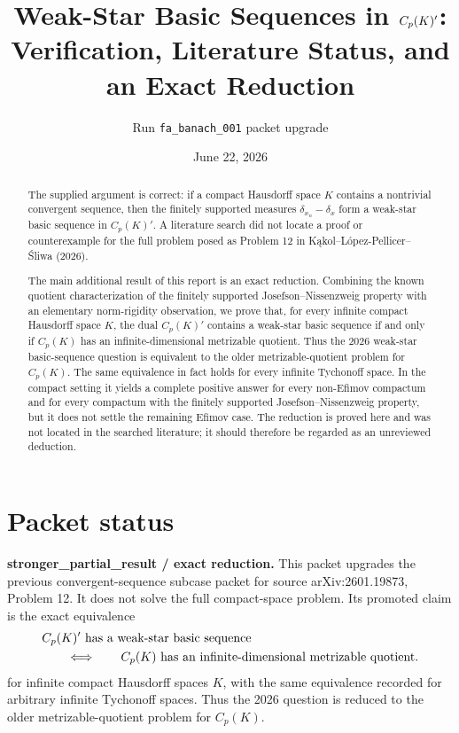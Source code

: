\documentclass[11pt]{article}
\title{Weak-Star Basic Sequences in $\Cp(K)'$: \\
Verification, Literature Status, and an Exact Reduction}
\author{Run \texttt{fa\_banach\_001} packet upgrade}
\date{June 22, 2026}
\newcommand{\Cp}{C_p}
\begin{document}
\maketitle

\begin{abstract}
The supplied argument is correct: if a compact Hausdorff space $K$ contains a
nontrivial convergent sequence, then the finitely supported measures
$\delta_{x_n}-\delta_x$ form a weak-star basic sequence in $\Cp(K)'$.  A
literature search did not locate a proof or counterexample for the full problem
posed as Problem 12 in K\k{a}kol--L\'opez-Pellicer--\'Sliwa (2026).

The main additional result of this report is an exact reduction.  Combining
the known quotient characterization of the finitely supported
Josefson--Nissenzweig property with an elementary norm-rigidity observation, we
prove that, for every infinite compact Hausdorff space $K$, the dual
$\Cp(K)'$ contains a weak-star basic sequence if and only if $\Cp(K)$ has an
infinite-dimensional metrizable quotient.  Thus the 2026 weak-star
basic-sequence question is equivalent to the older metrizable-quotient problem
for $\Cp(K)$.  The same equivalence in fact holds for every infinite
Tychonoff space.  In the compact setting it yields a complete positive answer
for every non-Efimov compactum and for every compactum with the finitely supported
Josefson--Nissenzweig property, but it does not settle the remaining Efimov
case.  The reduction is proved here and was not located in the searched
literature; it should therefore be regarded as an unreviewed deduction.
\end{abstract}

\section*{Packet status}

\textbf{stronger\_partial\_result / exact reduction.}  This packet upgrades
the previous convergent-sequence subcase packet for source arXiv:2601.19873,
Problem 12.  It does not solve the full compact-space problem.  Its promoted
claim is the exact equivalence
\[
\begin{aligned}
  &\Cp(K)' \hbox{ has a weak-star basic sequence}\\
  &\qquad\Longleftrightarrow\qquad
  \Cp(K) \hbox{ has an infinite-dimensional metrizable quotient}.
\end{aligned}
\]
for infinite compact Hausdorff spaces \(K\), with the same equivalence
recorded for arbitrary infinite Tychonoff spaces.  Thus the 2026 question is
reduced to the older metrizable-quotient problem for \(\Cp(K)\).
\end{document}
